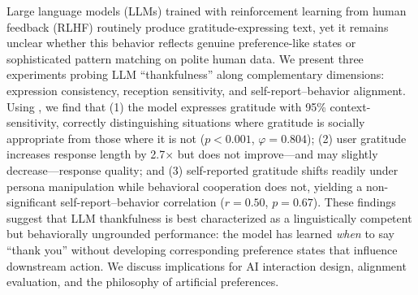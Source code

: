 Large language models (LLMs) trained with reinforcement learning from human feedback (RLHF) routinely produce gratitude-expressing text, yet it remains unclear whether this behavior reflects genuine preference-like states or sophisticated pattern matching on polite human data. We present three experiments probing LLM ``thankfulness'' along complementary dimensions: expression consistency, reception sensitivity, and self-report--behavior alignment. Using \gptfour, we find that (1) the model expresses gratitude with 95\% context-sensitivity, correctly distinguishing situations where gratitude is socially appropriate from those where it is not ($p < 0.001$, $\varphi = 0.804$); (2) user gratitude increases response length by 2.7$\times$ but does not improve---and may slightly decrease---response quality; and (3) self-reported gratitude shifts readily under persona manipulation while behavioral cooperation does not, yielding a non-significant self-report--behavior correlation ($r = 0.50$, $p = 0.67$). These findings suggest that LLM thankfulness is best characterized as a linguistically competent but behaviorally ungrounded performance: the model has learned \emph{when} to say ``thank you'' without developing corresponding preference states that influence downstream action. We discuss implications for AI interaction design, alignment evaluation, and the philosophy of artificial preferences.